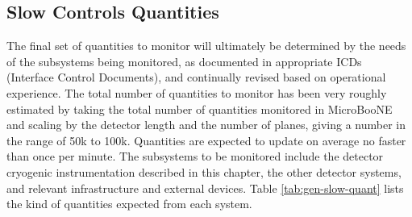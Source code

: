 \subsection{Slow Controls Quantities}
\label{sec:fdgen-slow-cryo-quant}


The final set of quantities to monitor will ultimately be determined
by the needs of the subsystems being monitored, as documented in
appropriate ICDs (Interface Control Documents), and continually revised based on operational
experience.  The total number of quantities to monitor has been very
roughly estimated by taking the total number of quantities monitored
in MicroBooNE and scaling by the detector length and the number of
planes, giving a number in the range of 50k to 100k.
Quantities are expected to update on average no faster than once per minute.
The subsystems
to be monitored include the detector cryogenic instrumentation
described in this chapter, the other detector systems, and relevant
infrastructure and external devices. Table \ref{tab:gen-slow-quant}
lists the kind of quantities expected from each system.


